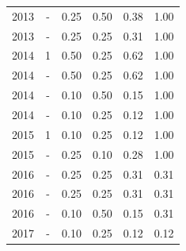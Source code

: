 \begin{table}[H]
\begin{tabular}{| l | c | c | c | c | c |}
          \\
            2013
          &
          -
          &
          0.25
          &
          0.50
          &
          0.38
          &
            {\color{blue} 1.00}
          \\
            2013
          &
          -
          &
          0.25
          &
          0.25
          &
          0.31
          &
            {\color{blue} 1.00}
          \\
\hline
            2014
          &
          1
          &
          0.50
          &
          0.25
          &
          0.62
          &
            {\color{blue} 1.00}
          \\
            2014
          &
          -
          &
          0.50
          &
          0.25
          &
          0.62
          &
            {\color{blue} 1.00}
          \\
            2014
          &
          -
          &
          0.10
          &
          0.50
          &
          0.15
          &
            {\color{blue} 1.00}
          \\
            2014
          &
          -
          &
          0.10
          &
          0.25
          &
          0.12
          &
            {\color{blue} 1.00}
          \\
\hline
            2015
          &
          1
          &
          0.10
          &
          0.25
          &
          0.12
          &
            {\color{blue} 1.00}
          \\
            2015
          &
          -
          &
          0.25
          &
          0.10
          &
          0.28
          &
            {\color{blue} 1.00}
          \\
\hline
            2016
          &
          -
          &
          0.25
          &
          0.25
          &
          0.31
          &
            {\color{red} 0.31}
          \\
            2016
          &
          -
          &
          0.25
          &
          0.25
          &
          0.31
          &
            {\color{red} 0.31}
          \\
            2016
          &
          -
          &
          0.10
          &
          0.50
          &
          0.15
          &
            {\color{red} 0.31}
          \\
\hline
            2017
          &
          -
          &
          0.10
          &
          0.25
          &
          0.12
          &
            {\color{red} 0.12}
          \\
\hline
\end{tabular}
\end{table}



